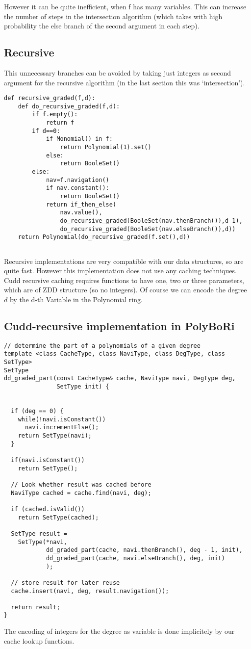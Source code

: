 \documentclass[]{article}
\newcommand{\PolyBoRi}{{\sc PolyBoRi}\xspace}
\begin{document}
However it can be quite inefficient, when f has many variables.
This can increase the number of steps in the intersection algorithm (which takes with high probability the else branch of the second argument in each step).
\subsection{Recursive}
This unnecessary branches can be avoided by taking just integers as second argument for the recursive algorithm (in the last section this was `intersection').

\begin{verbatim}
def recursive_graded(f,d):
    def do_recursive_graded(f,d):
        if f.empty():
            return f
        if d==0:
            if Monomial() in f:
                return Polynomial(1).set()
            else:
                return BooleSet()
        else:
            nav=f.navigation()
            if nav.constant():
                return BooleSet()
            return if_then_else(
                nav.value(),
                do_recursive_graded(BooleSet(nav.thenBranch()),d-1),
                do_recursive_graded(BooleSet(nav.elseBranch()),d))
    return Polynomial(do_recursive_graded(f.set(),d))
        
\end{verbatim}
Recursive implementations are very compatible with our data structures, so are quite fast. However this implementation does not use any caching techniques. Cudd recursive caching requires functions to have one, two or three parameters, which are of ZDD structure (so no integers).
Of course we can encode the degree $d$ by the d-th Variable in the Polynomial ring.
\subsection{Cudd-recursive implementation in \PolyBoRi}
\begin{verbatim}
// determine the part of a polynomials of a given degree
template <class CacheType, class NaviType, class DegType, class SetType>
SetType
dd_graded_part(const CacheType& cache, NaviType navi, DegType deg,  
               SetType init) {


  if (deg == 0) {
    while(!navi.isConstant())
      navi.incrementElse();
    return SetType(navi);
  }

  if(navi.isConstant())
    return SetType();

  // Look whether result was cached before
  NaviType cached = cache.find(navi, deg);

  if (cached.isValid())
    return SetType(cached);

  SetType result = 
    SetType(*navi,  
            dd_graded_part(cache, navi.thenBranch(), deg - 1, init),
            dd_graded_part(cache, navi.elseBranch(), deg, init)
            );

  // store result for later reuse
  cache.insert(navi, deg, result.navigation());

  return result;
}
\end{verbatim}
The encoding of integers for the degree as variable is done implicitely by our cache lookup functions.




\end{document}
